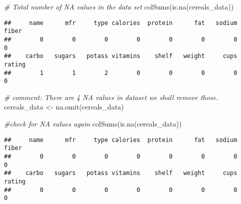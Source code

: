 \documentclass[
]{article}
\newenvironment{Shaded}{\begin{snugshade}}{\end{snugshade}}
\newcommand{\CommentTok}[1]{\textcolor[rgb]{0.56,0.35,0.01}{\textit{#1}}}
\newcommand{\ConstantTok}[1]{\textcolor[rgb]{0.00,0.00,0.00}{#1}}
\newcommand{\FunctionTok}[1]{\textcolor[rgb]{0.00,0.00,0.00}{#1}}
\newcommand{\NormalTok}[1]{#1}
\newcommand{\OtherTok}[1]{\textcolor[rgb]{0.56,0.35,0.01}{#1}}
\newcommand{\SpecialCharTok}[1]{\textcolor[rgb]{0.00,0.00,0.00}{#1}}
\begin{document}
\begin{Shaded}
\begin{Highlighting}[]
\CommentTok{\# Total number of NA values in the data set}
\FunctionTok{colSums}\NormalTok{(}\FunctionTok{is.na}\NormalTok{(cereals\_data))}
\end{Highlighting}
\end{Shaded}

\begin{verbatim}
##     name      mfr     type calories  protein      fat   sodium    fiber 
##        0        0        0        0        0        0        0        0 
##    carbo   sugars   potass vitamins    shelf   weight     cups   rating 
##        1        1        2        0        0        0        0        0
\end{verbatim}

\begin{Shaded}
\begin{Highlighting}[]
\CommentTok{\# comment: There are 4 NA values in dataset we shall remove those. }
\NormalTok{cereals\_data }\OtherTok{\textless{}{-}} \FunctionTok{na.omit}\NormalTok{(cereals\_data)}

\CommentTok{\#check for NA values again}
\FunctionTok{colSums}\NormalTok{(}\FunctionTok{is.na}\NormalTok{(cereals\_data))}
\end{Highlighting}
\end{Shaded}

\begin{verbatim}
##     name      mfr     type calories  protein      fat   sodium    fiber 
##        0        0        0        0        0        0        0        0 
##    carbo   sugars   potass vitamins    shelf   weight     cups   rating 
##        0        0        0        0        0        0        0        0
\end{verbatim}

\begin{Shaded}
\end{Shaded}
\end{document}
